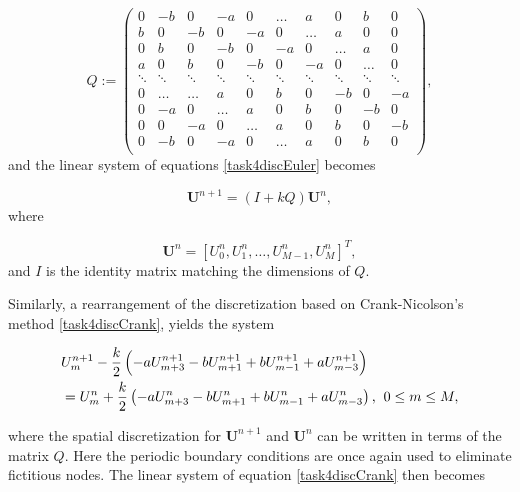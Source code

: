 \begin{equation*}
    Q := \begin{pmatrix} 
    0 & -b & 0 & -a & 0 & \dots & a & 0 & b & 0\\
    b & 0 & -b & 0 & -a & 0 & \dots & a & 0 & 0\\
    0 & b & 0 & -b & 0 & -a & 0 & \dots & a & 0\\
    a & 0 & b & 0 & -b & 0 & -a & 0 & \dots & 0\\
    \ddots & \ddots & \ddots & \ddots &\ddots&\ddots&\ddots&\ddots&\ddots&\ddots \\
    0 &  \dots & \dots & a & 0 & b & 0 & -b & 0 & -a \\
    0 & -a & 0  & \dots & a & 0 & b & 0 & -b & 0 \\
    0 & 0 & -a & 0 & \dots & a & 0 & b & 0 & -b \\
    0 & -b & 0 & -a & 0 & \dots & a & 0 & b & 0 \\
    \end{pmatrix},
\end{equation*}
and the linear system of equations \eqref{task4discEuler} becomes 

\begin{equation*}
    \boldsymbol{U}^{n+1} = (I+k Q) \boldsymbol{U}^{n},
\end{equation*}
where

\begin{equation*}
    \boldsymbol{U}^n = [U_0^n,U_1^n,\dots, U_{M-1}^n, U_{M}^n]^T,
\end{equation*}
and $I$ is the identity matrix matching the dimensions of $Q$. 

Similarly, a rearrangement of the discretization based on Crank-Nicolson's method \eqref{task4discCrank}, yields the system

\begin{equation*}
\begin{split}
&U_m^{n+1} - \frac{k}{2}\left(-a U_{m+3}^{n+1} - b U_{m+1}^{n+1} + b U_{m-1}^{n+1} + a U_{m-3}^{n+1}\right) \\ &= U_m^n + \frac{k}{2} \left(-a U_{m+3}^n - b U_{m+1}^n + b U_{m-1}^n +a U_{m-3}^n\right) \text{,} \hspace{2mm} 0 \leq m \leq M,
\end{split}
\end{equation*}

\noindent where the spatial discretization for $\boldsymbol{U}^{n+1}$ and $\boldsymbol{U}^n$ can be written in terms of the matrix $Q$. Here the periodic boundary conditions are once again used to eliminate fictitious nodes. The linear system of equation \eqref{task4discCrank} then becomes 

